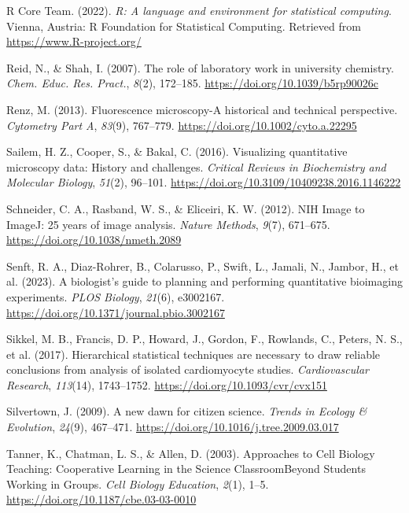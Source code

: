 \documentclass[
]{agujournal2019}
\newlength{\cslhangindent}
\newlength{\cslentryspacingunit} %
\newenvironment{CSLReferences}[2] %
 {%
  \setlength{\parindent}{0pt}
  \ifodd #1
  \let\oldpar\par
  \def\par{\hangindent=\cslhangindent\oldpar}
  \fi
  \setlength{\parskip}{#2\cslentryspacingunit}
 }%
 {}
\begin{document}
\begin{CSLReferences}{1}{0}
\leavevmode{}%
R Core Team. (2022). \emph{R: A language and environment for statistical
computing}. Vienna, Austria: R Foundation for Statistical Computing.
Retrieved from \url{https://www.R-project.org/}

\leavevmode{}%
Reid, N., \& Shah, I. (2007). The role of laboratory work in university
chemistry. \emph{Chem. Educ. Res. Pract.}, \emph{8}(2), 172--185.
\url{https://doi.org/10.1039/b5rp90026c}

\leavevmode{}%
Renz, M. (2013). Fluorescence microscopy-A historical and technical
perspective. \emph{Cytometry Part A}, \emph{83}(9), 767--779.
\url{https://doi.org/10.1002/cyto.a.22295}

\leavevmode{}%
Sailem, H. Z., Cooper, S., \& Bakal, C. (2016). Visualizing quantitative
microscopy data: History and challenges. \emph{Critical Reviews in
Biochemistry and Molecular Biology}, \emph{51}(2), 96--101.
\url{https://doi.org/10.3109/10409238.2016.1146222}

\leavevmode{}%
Schneider, C. A., Rasband, W. S., \& Eliceiri, K. W. (2012). NIH Image
to ImageJ: 25 years of image analysis. \emph{Nature Methods},
\emph{9}(7), 671--675. \url{https://doi.org/10.1038/nmeth.2089}

\leavevmode{}%
Senft, R. A., Diaz-Rohrer, B., Colarusso, P., Swift, L., Jamali, N.,
Jambor, H., et al. (2023). A biologist{'}s guide to planning and
performing quantitative bioimaging experiments. \emph{PLOS Biology},
\emph{21}(6), e3002167.
\url{https://doi.org/10.1371/journal.pbio.3002167}

\leavevmode{}%
Sikkel, M. B., Francis, D. P., Howard, J., Gordon, F., Rowlands, C.,
Peters, N. S., et al. (2017). Hierarchical statistical techniques are
necessary to draw reliable conclusions from analysis of isolated
cardiomyocyte studies. \emph{Cardiovascular Research}, \emph{113}(14),
1743--1752. \url{https://doi.org/10.1093/cvr/cvx151}

\leavevmode{}%
Silvertown, J. (2009). A new dawn for citizen science. \emph{Trends in
Ecology \& Evolution}, \emph{24}(9), 467--471.
\url{https://doi.org/10.1016/j.tree.2009.03.017}

\leavevmode{}%
Tanner, K., Chatman, L. S., \& Allen, D. (2003). Approaches to Cell
Biology Teaching: Cooperative Learning in the Science
Classroom{\textemdash}Beyond Students Working in Groups. \emph{Cell
Biology Education}, \emph{2}(1), 1--5.
\url{https://doi.org/10.1187/cbe.03-03-0010}


\end{CSLReferences}
\end{document}
